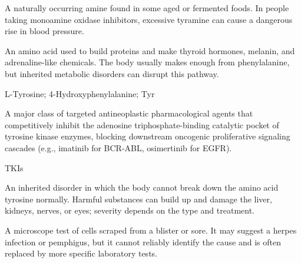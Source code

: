  A naturally occurring amine found in some aged or fermented foods. In people taking monoamine oxidase inhibitors, excessive tyramine can cause a dangerous rise in blood pressure.

 An amino acid used to build proteins and make thyroid hormones, melanin, and adrenaline-like chemicals. The body usually makes enough from phenylalanine, but inherited metabolic disorders can disrupt this pathway.

\synonyms
L-Tyrosine; 4-Hydroxyphenylalanine; Tyr

 A major class of targeted antineoplastic pharmacological agents that competitively inhibit the adenosine triphosphate-binding catalytic pocket of tyrosine kinase enzymes, blocking downstream oncogenic proliferative signaling cascades (e.g., imatinib for BCR-ABL, osimertinib for EGFR).

\synonyms
TKIs

 An inherited disorder in which the body cannot break down the amino acid tyrosine normally. Harmful substances can build up and damage the liver, kidneys, nerves, or eyes; severity depends on the type and treatment.

 A microscope test of cells scraped from a blister or sore. It may suggest a herpes infection or pemphigus, but it cannot reliably identify the cause and is often replaced by more specific laboratory tests.
